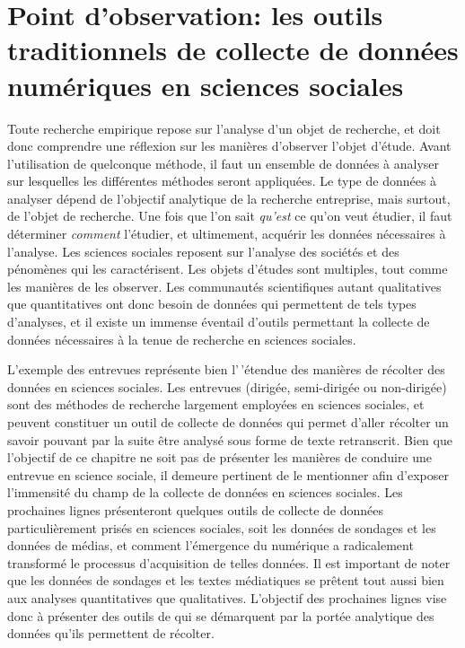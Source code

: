 \documentclass[
  letterpaper,
  DIV=11,
  numbers=noendperiod]{scrreprt}
\begin{document}
\section{\texorpdfstring{\textbf{Point d'observation: les outils
traditionnels de collecte de données numériques en sciences
sociales}}{Point d'observation: les outils traditionnels de collecte de données numériques en sciences sociales}}\label{point-dobservation-les-outils-traditionnels-de-collecte-de-donnuxe9es-numuxe9riques-en-sciences-sociales}

Toute recherche empirique repose sur l'analyse d'un objet de recherche,
et doit donc comprendre une réflexion sur les manières d'observer
l'objet d'étude. Avant l'utilisation de quelconque méthode, il faut un
ensemble de données à analyser sur lesquelles les différentes méthodes
seront appliquées. Le type de données à analyser dépend de l'objectif
analytique de la recherche entreprise, mais surtout, de l'objet de
recherche. Une fois que l'on sait \emph{qu'est} ce qu'on veut étudier,
il faut déterminer \emph{comment} l'étudier, et ultimement, acquérir les
données nécessaires à l'analyse. Les sciences sociales reposent sur
l'analyse des sociétés et des pénomènes qui les caractérisent. Les
objets d'études sont multiples, tout comme les manières de les observer.
Les communautés scientifiques autant qualitatives que quantitatives ont
donc besoin de données qui permettent de tels types d'analyses, et il
existe un immense éventail d'outils permettant la collecte de données
nécessaires à la tenue de recherche en sciences sociales.

L'exemple des entrevues représente bien l'\,'étendue des manières de
récolter des données en sciences sociales. Les entrevues (dirigée,
semi-dirigée ou non-dirigée) sont des méthodes de recherche largement
employées en sciences sociales, et peuvent constituer un outil de
collecte de données qui permet d'aller récolter un savoir pouvant par la
suite être analysé sous forme de texte retranscrit. Bien que l'objectif
de ce chapitre ne soit pas de présenter les manières de conduire une
entrevue en science sociale, il demeure pertinent de le mentionner afin
d'exposer l'immensité du champ de la collecte de données en sciences
sociales. Les prochaines lignes présenteront quelques outils de collecte
de données particulièrement prisés en sciences sociales, soit les
données de sondages et les données de médias, et comment l'émergence du
numérique a radicalement transformé le processus d'acquisition de telles
données. Il est important de noter que les données de sondages et les
textes médiatiques se prêtent tout aussi bien aux analyses quantitatives
que qualitatives. L'objectif des prochaines lignes vise donc à présenter
des outils de qui se démarquent par la portée analytique des données
qu'ils permettent de récolter.
\end{document}

